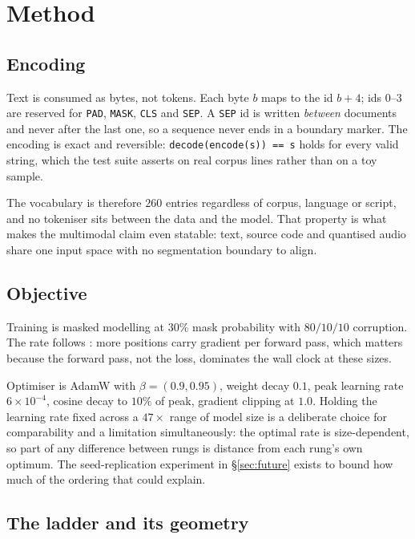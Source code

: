 \chapter{Method}
\label{ch:method}

\section{Encoding}

Text is consumed as bytes, not tokens. Each byte $b$ maps to the id $b + 4$; ids
$0$--$3$ are reserved for \texttt{PAD}, \texttt{MASK}, \texttt{CLS} and
\texttt{SEP}. A \texttt{SEP} id is written \emph{between} documents and never after
the last one, so a sequence never ends in a boundary marker. The encoding is exact
and reversible: \texttt{decode(encode(s)) == s} holds for every valid string, which
the test suite asserts on real corpus lines rather than on a toy sample.

The vocabulary is therefore $260$ entries regardless of corpus, language or script,
and no tokeniser sits between the data and the model. That property is what makes
the multimodal claim even statable: text, source code and quantised audio share one
input space with no segmentation boundary to align.

\section{Objective}

Training is masked modelling at $30\%$ mask probability with $80/10/10$
corruption. The rate follows \citet{portes2023mosaicbert}: more positions carry
gradient per forward pass, which matters because the forward pass, not the loss,
dominates the wall clock at these sizes.

Optimiser is AdamW with $\beta = (0.9, 0.95)$, weight decay $0.1$, peak learning
rate $6\times10^{-4}$, cosine decay to $10\%$ of peak, gradient clipping at $1.0$.
Holding the learning rate fixed across a $47\times$ range of model size is a
deliberate choice for comparability and a limitation simultaneously: the optimal
rate is size-dependent, so part of any difference between rungs is distance from
each rung's own optimum. The seed-replication experiment in \S\ref{sec:future}
exists to bound how much of the ordering that could explain.

\section{The ladder and its geometry}
\label{sec:ladder}

